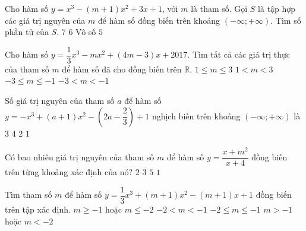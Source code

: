\begin{ex}%
	Cho hàm số $y=x^3-(m+1)x^2+3x+1$, với $m$ là tham số. Gọi $S$ là tập hợp các giá trị nguyên của $m$ để hàm số đồng biến trên khoảng $(-\infty;+\infty)$. Tìm số phần tử của $S$. 
	\choice
	{\True $7$}
	{$6$}
	{Vô số}
	{$5$}
\end{ex}
\begin{ex}%
	Cho hàm số $y=\dfrac{1}{3}x^3-mx^2+(4m-3)x+2017$. Tìm tất cả các giá trị thực của tham số $m$ để hàm số đã cho đồng biến trên $\mathbb{R}$. 
	\choice
	{\True $1\leq m\leq 3$}
	{$1<m<3$}
	{$-3\leq m\leq-1$}
	{$-3<m <-1$}
\end{ex}
\begin{ex}%
	Số giá trị nguyên của tham số $a$ để hàm số $y=-x^3+(a+1)x^2-\left(2a-\dfrac{2}{3}\right)+1$ nghịch biến trên khoảng $(-\infty;+\infty)$ là
	\choice
	{$3$}
	{$4$}
	{$2$}
	{\True $1$}
\end{ex}
\begin{ex}%
	Có bao nhiêu giá trị nguyên của tham số $m$ để hàm số $y=\dfrac{x+m^2}{x+4}$ đồng biến trên từng khoảng xác định của nó?
	\choice
	{$2$}
	{\True $3$}
	{$5$}
	{$1$}
\end{ex}
\begin{ex}%
	Tìm tham số $m$ để hàm số $y=\dfrac{1}{3}x^3+(m+1)x^2-(m+1)x+1$ đồng biến trên tập xác định. 
	\choice
	{$m\geq-1$ hoặc $m\leq-2$}
	{$-2<m <-1$}
	{\True $-2\leq m\leq-1$}
	{$m >-1$ hoặc $m <-2$}
\end{ex}
